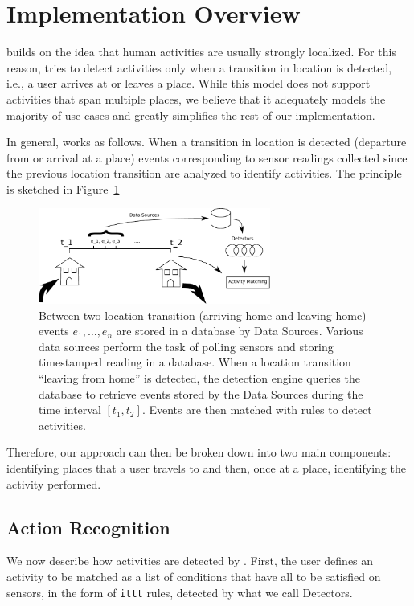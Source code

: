 \documentclass{acm_proc_article-sp}
\begin{document}
\section{Implementation Overview}

\LS builds on the idea that human activities are usually strongly localized. For this reason, \LS tries to detect activities only when a transition in location is detected, i.e., a user arrives at or leaves a place. While this model does not support activities that span multiple places, we believe that it adequately models the majority of use cases and greatly simplifies the rest of our implementation. 

In general, \LS works as follows. When a transition in location is detected (departure from or arrival at a place) events corresponding to sensor readings collected since the previous location transition are analyzed to identify activities. The principle is sketched in Figure~\ref{figure:principle}

\begin{figure}
\begin{center}
\includegraphics[width=3in]{logic}
\caption{
Between two location transition (arriving home and leaving home) events $e_1, \dots, e_n$ are stored in a database by Data Sources. Various data sources perform the task of polling sensors and storing timestamped reading in a database. When a location transition ``leaving from home'' is detected, the detection engine queries the database to retrieve events stored by the Data Sources during the time interval $[t_1, t_2]$. Events are then matched with rules to detect activities. 
}
\label{figure:principle}
\end{center}
\end{figure}


Therefore, our approach can then be broken down into two main components: identifying places that a user travels to and then, once at a place, identifying the activity performed.

\subsection {Action Recognition}
We now describe how activities are detected by \LS. First, the user defines an activity to be matched as a list of conditions that have all to be satisfied on sensors, in the form of {\tt ittt} rules\cite{ittt}, detected by what we call Detectors.
\end{document}
